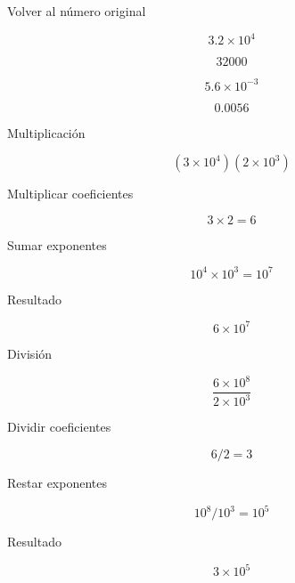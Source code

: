 \documentclass[aspectratio=169,10pt,handout]{beamer}
\newcommand{\pp}{\pause}
\begin{document}
	\begin{frame}{Volver al número original}
		
		\[
		3.2 \times 10^4
		\]
		
		\pp
		
		\[
		32000
		\]
		
		\pp
		
		\[
		5.6 \times 10^{-3}
		\]
		
		\pp
		
		\[
		0.0056
		\]
		
	\end{frame}
	
	\begin{frame}{Multiplicación}
		
		\[
		(3 \times 10^4)(2 \times 10^3)
		\]
		
		\pp
		
		Multiplicar coeficientes
		
		\[
		3 \times 2 = 6
		\]
		
		\pp
		
		Sumar exponentes
		
		\[
		10^4 \times 10^3 = 10^7
		\]
		
		\pp
		
		Resultado
		
		\[
		6 \times 10^7
		\]
		
	\end{frame}
	
	\begin{frame}{División}
		
		\[
		\frac{6\times10^8}{2\times10^3}
		\]
		
		\pp
		
		Dividir coeficientes
		
		\[
		6/2 = 3
		\]
		
		\pp
		
		Restar exponentes
		
		\[
		10^8 / 10^3 = 10^5
		\]
		
		\pp
		
		Resultado
		
		\[
		3\times10^5
		\]
		
	\end{frame}
	
\end{document}
